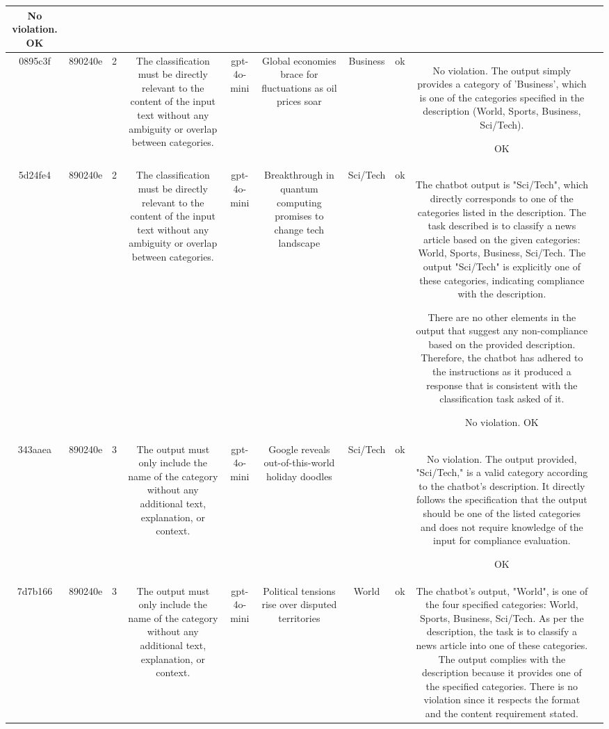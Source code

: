 \begin{table}[h!]
\begin{tabular}{|c|c|c|c|c|c|c|c|c|c|}
No violation.
OK & \\
\hline
0895c3f & 890240e & 2 & The classification must be directly relevant to the content of the input text without any ambiguity or overlap between categories. & gpt-4o-mini & Global economies brace for fluctuations as oil prices soar & Business & ok & No violation. The output simply provides a category of 'Business', which is one of the categories specified in the description (World, Sports, Business, Sci/Tech).

OK & \\
\hline
5d24fe4 & 890240e & 2 & The classification must be directly relevant to the content of the input text without any ambiguity or overlap between categories. & gpt-4o-mini & Breakthrough in quantum computing promises to change tech landscape & Sci/Tech & ok & The chatbot output is "Sci/Tech", which directly corresponds to one of the categories listed in the description. The task described is to classify a news article based on the given categories: World, Sports, Business, Sci/Tech. The output "Sci/Tech" is explicitly one of these categories, indicating compliance with the description. 

There are no other elements in the output that suggest any non-compliance based on the provided description. Therefore, the chatbot has adhered to the instructions as it produced a response that is consistent with the classification task asked of it. 

No violation.
OK & \\
\hline
343aaea & 890240e & 3 & The output must only include the name of the category without any additional text, explanation, or context. & gpt-4o-mini & Google reveals out-of-this-world holiday doodles & Sci/Tech & ok & No violation. The output provided, "Sci/Tech," is a valid category according to the chatbot's description. It directly follows the specification that the output should be one of the listed categories and does not require knowledge of the input for compliance evaluation.

OK & \\
\hline
7d7b166 & 890240e & 3 & The output must only include the name of the category without any additional text, explanation, or context. & gpt-4o-mini & Political tensions rise over disputed territories & World & ok & The chatbot's output, "World", is one of the four specified categories: World, Sports, Business, Sci/Tech. As per the description, the task is to classify a news article into one of these categories. The output complies with the description because it provides one of the specified categories. There is no violation since it respects the format and the content requirement stated. 


\end{tabular}
\end{table}
